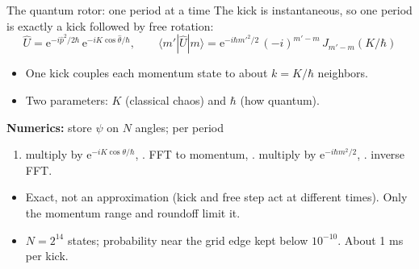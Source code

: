 \documentclass[aspectratio=169,10pt]{beamer}
\newcommand{\ee}{\mathrm{e}}
\begin{document}
\begin{frame}{The quantum rotor: one period at a time}
  The kick is instantaneous, so one period is exactly a kick followed by free rotation:
  \[
    \hat U = \ee^{-i\hat p^2/2\hbar}\,\ee^{-iK\cos\hat\theta/\hbar},
    \qquad
    \langle m'|\hat U|m\rangle = \ee^{-i\hbar m'^2/2}\,(-i)^{m'-m}\,J_{m'-m}(K/\hbar)
  \]
  \begin{itemize}
    \item One kick couples each momentum state to about $k = K/\hbar$ neighbors.
    \item Two parameters: $K$ (classical chaos) and $\hbar$ (how quantum).
  \end{itemize}
  \textbf{Numerics:} store $\psi$ on $N$ angles; per period
  \begin{enumerate}
    \item multiply by $\ee^{-iK\cos\theta/\hbar}$, . FFT to momentum, . multiply by
    $\ee^{-i\hbar m^2/2}$, . inverse FFT.
  \end{enumerate}
  \begin{itemize}
    \item Exact, not an approximation (kick and free step act at different times). Only the momentum range and
    roundoff limit it.
    \item $N = 2^{14}$ states; probability near the grid edge kept below $10^{-10}$. About 1 ms per kick.
  \end{itemize}
\end{frame}
\end{document}
